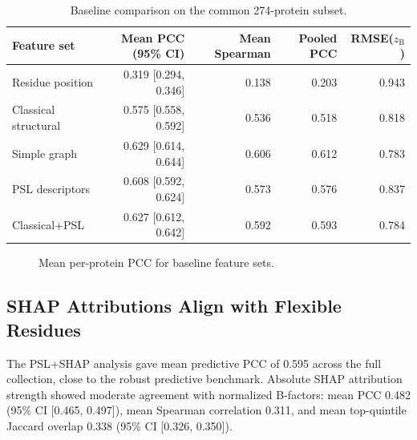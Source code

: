 \documentclass[11pt]{article}
\newcommand{\zB}{z_{\mathrm{B}}}
\begin{document}
\begin{table}[htbp]
\centering
\caption{Baseline comparison on the common 274-protein subset.}
\label{tab:baseline_comparison}
\begin{tabular}{lrrrr}
\toprule
Feature set & Mean PCC (95\% CI) & Mean Spearman & Pooled PCC & RMSE($\zB$) \\
\midrule
Residue position & 0.319 [0.294, 0.346] & 0.138 & 0.203 & 0.943 \\
Classical structural & 0.575 [0.558, 0.592] & 0.536 & 0.518 & 0.818 \\
Simple graph & 0.629 [0.614, 0.644] & 0.606 & 0.612 & 0.783 \\
PSL descriptors & 0.608 [0.592, 0.624] & 0.573 & 0.576 & 0.837 \\
Classical+PSL & 0.627 [0.612, 0.642] & 0.592 & 0.593 & 0.784 \\
\bottomrule
\end{tabular}
\end{table}

\begin{figure}[htbp]
\centering
{}
\caption{Mean per-protein PCC for baseline feature sets.}
\label{fig:baseline_pcc}
\end{figure}

\subsection{SHAP Attributions Align with Flexible Residues}
The PSL+SHAP analysis gave mean predictive PCC of 0.595 across the full collection, close to the robust predictive benchmark. Absolute SHAP attribution strength showed moderate agreement with normalized B-factors: mean PCC 0.482 (95\% CI [0.465, 0.497]), mean Spearman correlation 0.311, and mean top-quintile Jaccard overlap 0.338 (95\% CI [0.326, 0.350]).
\end{document}

